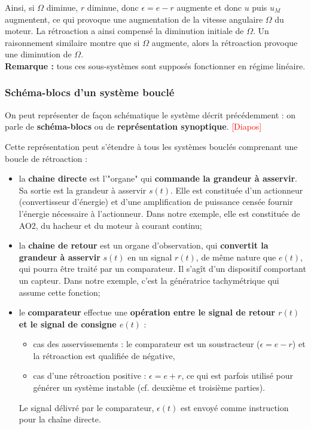 \documentclass[11pt,a4paper]{report}
\begin{document}
Ainsi, si $\Omega$ diminue, $r$ diminue, donc $\epsilon = e - r$ augmente et donc $u$ puis $u_M$ augmentent, ce qui provoque une augmentation de la vitesse angulaire $\Omega$ du moteur. La rétroaction a ainsi compensé la diminution initiale de $\Omega$. Un raisonnement similaire montre que si $\Omega$ augmente, alors la rétroaction provoque une diminution de $\Omega$.\\

\textbf{Remarque :} tous ces sous-systèmes sont supposés fonctionner en régime linéaire.

\subsubsection{Schéma-blocs d'un système bouclé}

On peut représenter de façon schématique le système décrit précédemment : on parle de \textbf{schéma-blocs} ou de \textbf{représentation synoptique}. \textcolor{red}{[Diapos]}

Cette représentation peut s'étendre à tous les systèmes bouclés comprenant une boucle de rétroaction :
\begin{itemize}
	\item la \textbf{chaine directe} est l'"organe" qui \textbf{commande la grandeur à asservir}. Sa sortie est la grandeur à asservir $s(t)$. Elle est constituée d'un actionneur (convertisseur d'énergie) et d'une amplification de puissance censée fournir l'énergie nécessaire à l'actionneur. Dans notre exemple, elle est constituée de AO2, du hacheur et du moteur à courant continu;\\
	\item la \textbf{chaine de retour} est un organe d'observation, qui \textbf{convertit la grandeur à asservir} $s(t)$ en un signal $r(t)$, de même nature que $e(t)$, qui pourra être traité par un comparateur. Il s'agît d'un dispositif comportant un capteur. Dans notre exemple, c'est la génératrice tachymétrique qui assume cette fonction;\\
	\item le \textbf{comparateur} effectue une \textbf{opération entre le signal de retour $r(t)$ et le signal de consigne $e(t)$} :
	\begin{itemize}
		\item cas des asservissements : le comparateur est un soustracteur ($\epsilon = e - r$) et la rétroaction est qualifiée de négative,
		\item cas d'une rétroaction positive : $\epsilon = e + r$, ce qui est parfois utilisé pour générer un système instable (cf. deuxième et troisième parties).
	\end{itemize}
	Le signal délivré par le comparateur, $\epsilon(t)$ est envoyé comme instruction pour la chaîne directe.
\end{itemize}
\end{document}
